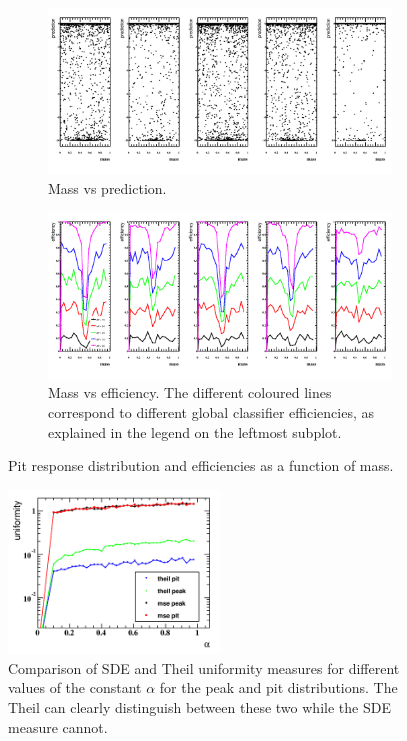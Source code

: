\begin{figure}[h]
\centering
		\begin{subfigure}[b]{0.95\textwidth}
			\includegraphics[width=\textwidth]{graphs/PitDistributions.png}
			\caption{Mass vs prediction.}
		\end{subfigure}
		\begin{subfigure}[b]{0.95\textwidth}
			\includegraphics[width=\textwidth]{graphs/PitEffs.png}
			\caption{Mass vs efficiency. The different coloured lines correspond to
				different global classifier efficiencies, as explained in the legend on the leftmost subplot.}
		\end{subfigure}
		\caption{Pit response distribution and efficiencies as a function of mass. \label{fig:pitdists}}
\end{figure}

\begin{figure}[h]
\centering
	\includegraphics[width=0.5\textwidth]{graphs/TheilVsMSE.png}
	\caption{Comparison of SDE and Theil uniformity measures for different values of the constant $\alpha$ for the peak and pit distributions.
The Theil can clearly distinguish between these two while the SDE measure cannot.}
\end{figure}

